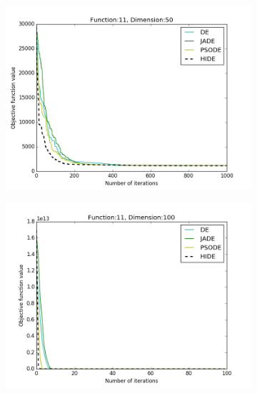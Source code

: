 \documentclass[a4paper,twoside]{article}
\begin{document}
\begin{figure}[t!]
\begin{subfigure}[b]{0.24\textwidth}
        \includegraphics[width=\textwidth,natwidth=800,natheight=600]{plot_50D_F11_save}
        \caption{}
    \end{subfigure}
    \begin{subfigure}[b]{0.24\textwidth}
        \includegraphics[width=\textwidth,natwidth=800,natheight=600]{plot_100D_F11_save}
        \caption{}
    \end{subfigure}


\end{figure}
\end{document}
